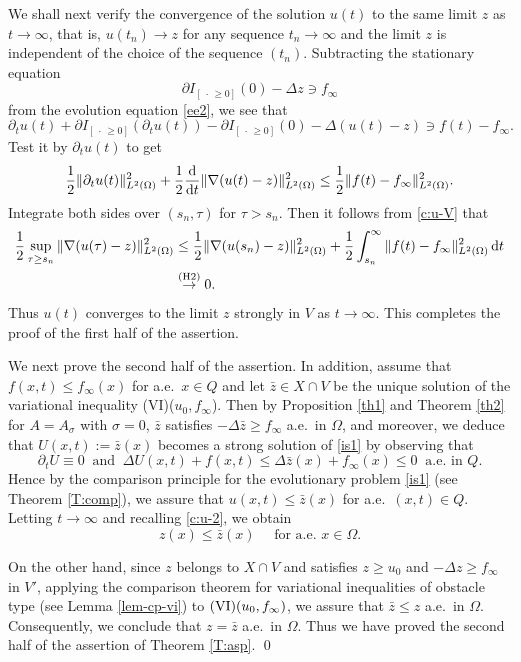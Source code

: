 \documentclass[reqno,10pt]{amsart}
\begin{document}
We shall next verify the convergence of the solution $u(t)$ to the same limit
 ${z}$ as $t \to \infty$, that is, $u(t_n) \to {z}$ for any sequence $t_n
 \to \infty$ and the limit ${z}$ is independent of the choice of the
 sequence $(t_n)$. Subtracting the stationary equation
$$
\partial {I_{[~\cdot\, \geq 0]}} (0) - \Delta {z} \ni f_\infty
$$
from the evolution equation \eqref{ee2}, we see that 
$$
\partial_t u(t) + \partial {I_{[~\cdot\, \geq 0]}}(\partial_t u(t)) - \partial {I_{[~\cdot\, \geq 0]}}(0)
- \Delta \left( u(t) - {z} \right) \ni f(t) - f_\infty.
$$
Test it by $\partial_t u(t)$ to get
$$
\dfrac 1 2 \|\partial_t u(t)\|_{L^2(\Omega)}^2 
+ \dfrac 1 2 \dfrac{\text{\rm d}}{{\text{\rm d}} t} \|\nabla (u(t) - {z})\|_{L^2(\Omega)}^2 
\leq \dfrac 1 2 \|f(t) - f_\infty\|_{L^2(\Omega)}^2.
$$
Integrate both sides over $(s_n, \tau)$ for $\tau > s_n$. Then it follows
 from \eqref{c:u-V} that
\begin{align*}
\dfrac 1 2 \sup_{\tau \geq s_n} \|\nabla (u(\tau) - {z})\|_{L^2(\Omega)}^2
&\leq \dfrac 1 2 \|\nabla (u(s_n) - {z})\|_{L^2(\Omega)}^2
+ \dfrac 1 2 \int^\infty_{s_n} \|f(t) - f_\infty\|_{L^2(\Omega)}^2 \,{\text{\rm d}} t\\
&\stackrel{\text{(H2)}}{\to} 0.
\end{align*}
Thus $u(t)$ converges to the limit ${z}$ strongly in
 $V$ as $t \to \infty$. This completes the proof of the first half of
 the assertion.

We next prove the second half of the assertion.
In addition, assume that $f(x,t) \leq f_\infty(x)$ for a.e.~$x \in Q$
and let $\bar {z} \in X \cap V$ be the unique solution of the variational
 inequality (VI)($u_0,f_\infty$). Then by Proposition \ref{th1} and
 Theorem \ref{th2} for $A = A_\sigma$ with $\sigma = 0$, $\bar {z}$
 satisfies $-\Delta \bar {z} \geq f_\infty$ a.e.~in $\Omega$, and
 moreover, we deduce that $U(x,t) := \bar {z}(x)$ becomes a strong
 solution of \eqref{is1} by observing that
$$
\partial_t U \equiv 0 \ \mbox{ and } \
\Delta U(x,t) + f(x,t) \leq \Delta \bar {z}(x) + f_\infty(x) \leq 0
\ \mbox{ a.e.~in } Q.
$$
Hence by the comparison principle for the evolutionary problem \eqref{is1}
(see Theorem \ref{T:comp}), we assure that $u(x,t) \leq \bar {z}(x)$
for a.e.~$(x,t) \in Q$. Letting $t \to \infty$ and recalling
\eqref{c:u-2}, we obtain
$$
{z}(x) \leq \bar {z}(x) \quad \mbox{ for a.e. } x \in \Omega.
$$

On the other hand, since ${z}$ belongs to $X \cap V$ and satisfies ${z}
\geq u_0$ and $-\Delta {z} \geq f_\infty$ in $V'$, applying the comparison
theorem for variational inequalities of obstacle type (see Lemma
\ref{lem-cp-vi}) to ${\rm (VI)}(u_0,f_\infty)$, we assure that
$\bar {z} \leq {z}$ a.e.~in $\Omega$. Consequently, we
 conclude that ${z} = \bar {z}$ a.e.~in $\Omega$.
 Thus we have proved the second half of the assertion of Theorem
 \ref{T:asp}. \qed
\end{document}

